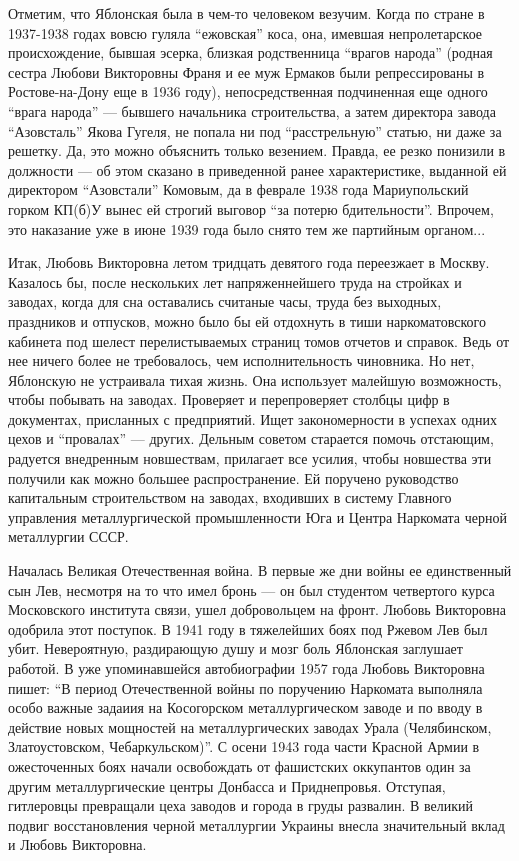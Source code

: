 Отметим, что Яблонская была в чем-то человеком везучим. Когда по стране в
1937-1938 годах вовсю гуляла \enquote{ежовская} коса, она, имевшая непролетарское
происхождение, бывшая эсерка, близкая родственница \enquote{врагов народа} (родная
сестра Любови Викторовны Франя и ее муж Ермаков были репрессированы в
Ростове-на-Дону еще в 1936 году), непосредственная подчиненная еще одного
\enquote{врага народа} — бывшего начальника строительства, а затем директора завода
\enquote{Азовсталь} Якова Гугеля, не попала ни под \enquote{расстрельную} статью, ни даже за
решетку. Да, это можно объяснить только везением. Правда, ее резко понизили в
должности — об этом сказано в приведенной ранее характеристике, выданной ей
директором \enquote{Азовстали} Комовым, да в феврале 1938 года Мариупольский горком
КП(б)У вынес ей строгий выговор \enquote{за потерю бдительности}. Впрочем, это
наказание уже в июне 1939 года было снято тем же партийным органом...

Итак, Любовь Викторовна летом тридцать девятого года переезжает в Москву.
Казалось бы, после нескольких лет напряженнейшего труда на стройках и заводах,
когда для сна оставались считаные часы, труда без выходных, праздников и
отпусков, можно было бы ей отдохнуть в тиши наркоматовского кабинета под шелест
перелистываемых страниц томов отчетов и справок. Ведь от нее ничего более не
требовалось, чем исполнительность чиновника. Но нет, Яблонскую не устраивала
тихая жизнь. Она использует малейшую возможность, чтобы побывать на заводах.
Проверяет и перепроверяет столбцы цифр в документах, присланных с предприятий.
Ищет закономерности в успехах одних цехов и \enquote{провалах} — других. Дельным
советом старается помочь отстающим, радуется внедренным новшествам, прилагает
все усилия, чтобы новшества эти получили как можно большее распространение. Ей
поручено руководство капитальным строительством на заводах, входивших в систему
Главного управления металлургической промышленности Юга и Центра Наркомата
черной металлургии СССР.

Началась Великая Отечественная война. В первые же дни войны ее единственный сын
Лев, несмотря на то что имел бронь — он был студентом четвертого курса
Московского института связи, ушел добровольцем на фронт. Любовь Викторовна
одобрила этот поступок. В 1941 году в тяжелейших боях под Ржевом Лев был убит.
Невероятную, раздирающую душу и мозг боль Яблонская заглушает работой. В уже
упоминавшейся автобиографии 1957 года Любовь Викторовна пишет: \enquote{В период
Отечественной войны по поручению Наркомата выполняла особо важные задаиия на
Косогорском металлургическом заводе и по вводу в действие новых мощностей на
металлургических заводах Урала (Челябинском, Златоустовском, Чебаркульском)}. С
осени 1943 года части Красной Армии в ожесточенных боях начали освобождать от
фашистских оккупантов один за другим металлургические центры Донбасса и
Приднепровья. Отступая, гитлеровцы превращали цеха заводов и города в груды
развалин. В великий подвиг восстановления черной металлургии Украины внесла
значительный вклад и Любовь Викторовна.

